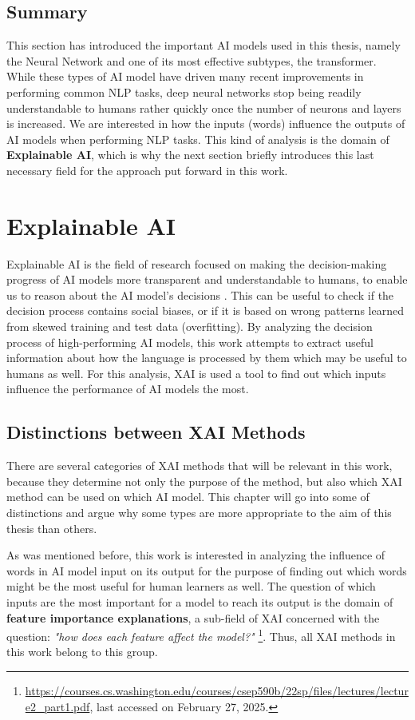 \subsection{Summary}
This section has introduced the important AI models used in this thesis, namely the Neural Network and one of its most effective subtypes, the transformer.
While these types of AI model have driven many recent improvements in performing common NLP tasks, deep neural networks stop being readily understandable to humans rather quickly once the number of neurons and layers is increased.
We are interested in how the inputs (words) influence the outputs of AI models when performing NLP tasks.
This kind of analysis is the domain of \textbf{Explainable AI}, which is why the next section briefly introduces this last necessary field for the approach put forward in this work.

\section{Explainable AI} \label{sec:explainable-ai}
Explainable AI is the field of research focused on making the decision-making progress of AI models more transparent and understandable to humans, to enable us to reason about the AI model's decisions \cite{viloneNotionsExplainabilityEvaluation2021}.
This can be useful to check if the decision process contains social biases, or if it is based on wrong patterns learned from skewed training and test data (overfitting).
By analyzing the decision process of high-performing AI models, this work attempts to extract useful information about how the language is processed by them which may be useful to humans as well.
For this analysis, XAI is used a tool to find out which inputs influence the performance of AI models the most.

\subsection{Distinctions between XAI Methods}
There are several categories of XAI methods that will be relevant in this work, because they determine not only the purpose of the method, but also which XAI method can be used on which AI model.
This chapter will go into some of distinctions and argue why some types are more appropriate to the aim of this thesis than others.

As was mentioned before, this work is interested in analyzing the influence of words in AI model input on its output for the purpose of finding out which words might be the most useful for human learners as well.
The question of which inputs are the most important for a model to reach its output is the domain of \textbf{feature importance explanations}, a sub-field of XAI concerned with the question: \textit{"how does each feature affect the model?"} \footnote{\url{https://courses.cs.washington.edu/courses/csep590b/22sp/files/lectures/lecture2_part1.pdf}, last accessed on February 27, 2025.}.
Thus, all XAI methods in this work belong to this group.

